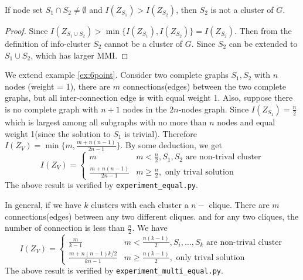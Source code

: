 \documentclass{article}
\begin{document}
\begin{proposition}\label{prop:sub}
If node set $S_1 \cap S_2 \neq \emptyset$ and $I(Z_{S_1}) > I(Z_{S_2})$, then $S_2$ is not a cluster of $G$.
\end{proposition}
\begin{proof}
Since $I(Z_{S_1\cup S_2}) > \min\{I(Z_{S_1}), I(Z_{S_2})\} = I(Z_{S_2})$. Then from the definition of info-cluster $S_2$ cannot be a cluster of $G$.
Since $S_2$ can be extended to $S_1\cup S_2$, which has larger MMI.
\end{proof}
\begin{example}\label{ex:2c}
We extend example \ref{ex:6point}. Consider two complete graphs $S_1, S_2$ with $n$ nodes (weight = 1), there are $m$ connections(edges) between the two complete graphs, but all inter-connection edge is with equal weight 1. Also, suppose there is no complete graph with $n+1$ nodes in the $2n$-nodes graph. Since $I(Z_{S_1})=\frac{n}{2}$ which is largest among all subgraphs with no more than $n$ nodes and equal weight 1(since the solution to $S_1$ is trivial). Therefore $I(Z_V) = \min\{m, \frac{m+n(n-1)}{2n-1}\}$. By some deduction, we get
\begin{equation}\label{eq:ee}
I(Z_V) = \begin{cases}
m & m <\frac{n}{2}, S_1,S_2 \textrm{ are non-trival cluster} \\
\frac{m+n(n-1)}{2n-1} & m\geq \frac{n}{2}, \textrm{ only trival solution} 
\end{cases}
\end{equation}
The above result is verified by \texttt{experiment\_equal.py}.

In general, if we have $k$ clusters with each cluster a $n-$ clique. There are $m$ connections(edges) between any two different cliques.  and for any two cliques, the number of connection is less than $\frac{n}{2}$.
We have
\begin{equation}\label{eq:me}
I(Z_V) = \begin{cases}
\frac{m}{k-1} & m <\frac{n(k-1)}{2}, S_i,\dots, S_k \textrm{ are non-trival cluster} \\
\frac{m+n(n-1)k/2}{kn-1} & m\geq \frac{n(k-1)}{2}, \textrm{ only trival solution} 
\end{cases}
\end{equation}
The above result is verified by \texttt{experiment\_multi\_equal.py}.
\end{example}
\end{document}
